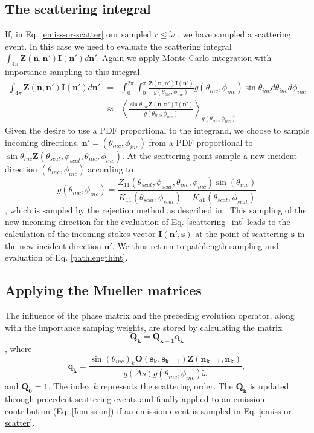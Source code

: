 \subsection {The scattering integral}

If, in Eq. \ref{emiss-or-scatter} our sampled $r\le\tilde{\omega}$
, we have sampled a scattering event.  In this case we need to evaluate the scattering
integral $\int_{4\pi}\mathbf{Z(n,n')}\mathbf{I(n')}d\mathbf{n'}$.
Again we apply Monte Carlo integration with importance sampling to
this integral.
\begin{eqnarray}
\int_{4\pi}\mathbf{Z(n,n')}\mathbf{I(n')}d\mathbf{n'}&=&\int_0^{2\pi}\int_0^\pi\frac{\mathbf{Z(n,n')}\mathbf{I(n')}}{g(\theta_{inc},\phi_{inc})}g(\theta_{inc},\phi_{inc})\sin{\theta_{inc}}d\theta_{inc}d\phi_{inc}\\
&\approx&\left\langle\frac{\sin{\theta_{inc}}\mathbf{Z(n,n')}\mathbf{I(n')}}{g(\theta_{inc},\phi_{inc})}\right\rangle_{g(\theta_{inc},\phi_{inc})}
\label{scattering_int}
\end{eqnarray}
Given the desire to use a PDF proportional to the integrand, we
choose to sample incoming directions,
$\mathbf{n'}=(\theta_{inc},\phi_{inc})$ from a PDF proportional
to $\sin{\theta_{inc}}\mathbf{Z}(\theta_{scat},\phi_{scat},\theta_{inc},\phi_{inc})$.
At the scattering point sample a new incident direction
  $(\theta_{inc},\phi_{inc})$ according to 
\begin{equation}
g(\theta_{inc},\phi_{inc})=\frac{Z_{11}(\theta_{scat},\phi_{scat},
\theta_{inc},\phi_{inc})\sin(\theta_{inc})}{K_{11}(\theta_{scat},\phi_{scat})
  - K_{a1}(\theta_{scat},\phi_{scat})}
\label{gdir}
\end{equation}
, which is
sampled by the rejection method as described in \cite{liu:01}.  This sampling of the new incoming direction for the evaluation of Eq. \ref{scattering_int} leads to the calculation of the incoming stokes vector $\mathbf{I(n',s)}$ at the point of scattering $\mathbf{s}$ in the new incident direction $\mathbf{n'}$. We thus return to pathlength sampling and evaluation of Eq. \ref{pathlengthint}.  

\subsection{Applying the Mueller matrices}

The influence of the phase matrix and the preceding evolution operator, along with the importance samping weights, are stored by calculating the matrix
\begin{equation}
\mathbf{Q_k}=\mathbf{Q_{k-1}q_k}
\label{Q}
\end{equation}
, where
\begin{equation}
\mathbf{q_k}=\frac{\sin(\theta_{inc})_k
  \mathbf{O(s_k,s_{k-1})}\mathbf{Z(n_{k-1},n_k)}}
  {g\left(\Delta s\right)g(\theta_{inc},\phi_{inc}) \tilde{\omega}} ,
\label{q}
\end{equation}
and $\mathbf{Q_0}={1}$. The index $k$ represents the
scattering order.  The $\mathbf{Q_k}$ is updated through precedent scattering events and finally applied to an emission contribution (Eq. \ref{Iemission}) if an emission event is sampled in Eq. \ref{emiss-or-scatter}.  

